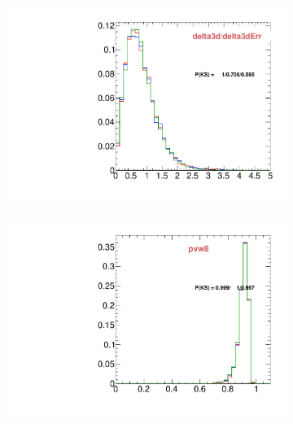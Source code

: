 \begin{figure}
\begin{subfigure}[b]{0.2\textwidth}
                \includegraphics[width=\textwidth]{Figures/VariablesComparison/MC_endcaps_figs_3h/delta3dErr}
                \label{fig:MC_endcaps_delta3d/delta3dErr_3h}
        \end{subfigure}
        \begin{subfigure}[b]{0.2\textwidth}
                \centering
                \includegraphics[width=\textwidth]{Figures/VariablesComparison/MC_endcaps_figs_3h/pvw8}
                \label{fig:MC_endcaps_pvw8_3h}
        \end{subfigure}
        \begin{subfigure}[b]{0.2\textwidth}
                \centering

\end{subfigure}
\end{figure}
